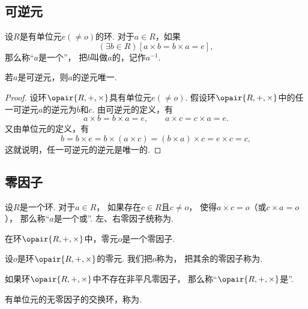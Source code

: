 \subsection{可逆元}
\begin{definition}
设\(R\)是有单位元\(e(\neq o)\)的环.
对于\(a \in R\)，如果\[
	(\exists b \in R)[a \times b = b \times a = e],
\]
那么称“\(a\)是一个”，
把\(b\)叫做\(a\)的，记作\(a^{-1}\).
\end{definition}

\begin{proposition}
若\(a\)是可逆元，则\(a\)的逆元唯一.
\begin{proof}
设环\(\opair{R,+,\times}\)具有单位元\(e(\neq o)\).
假设环\(\opair{R,+,\times}\)中的任一可逆元\(a\)的逆元为\(b\)和\(c\).
由可逆元的定义，有\[
    a \times b = b \times a = e,
	\qquad
    a \times c = c \times a = e.
\]
又由单位元的定义，有\[
    b = b \times e
    = b \times (a \times c)
    = (b \times a) \times c
    = e \times c
    = c,
\]
这就说明，任一可逆元的逆元是唯一的.
\end{proof}
\end{proposition}

\subsection{零因子}
\begin{definition}
设\(R\)是一个环.
对于\(a \in R\)，
如果存在\(c \in R\)且\(c \neq o\)，
使得\(a \times c = o\)（或\(c \times a = o\)），
那么称“\(a\)是一个或”.
左、右零因子统称为.
\end{definition}

\begin{proposition}
在环\(\opair{R,+,\times}\)中，零元\(o\)是一个零因子.
\end{proposition}

\begin{definition}
设\(o\)是环\(\opair{R,+,\times}\)的零元.
我们把\(o\)称为，
把其余的零因子称为.
\end{definition}

\begin{definition}
如果环\(\opair{R,+,\times}\)中不存在非平凡零因子，
那么称“\(\opair{R,+,\times}\)是”.
\end{definition}

\begin{definition}
有单位元的无零因子的交换环，称为.
\end{definition}

